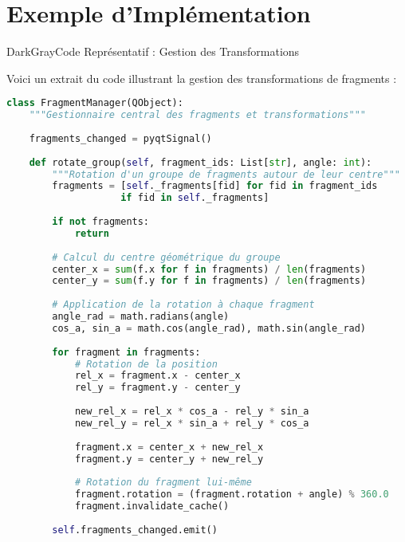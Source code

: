 \documentclass[11pt,a4paper]{article}
\begin{document}
\section{Exemple d'Implémentation}

\begin{subsectionbox}{DarkGray}{Code Représentatif : Gestion des Transformations}

Voici un extrait du code illustrant la gestion des transformations de fragments :

\begin{lstlisting}[language=Python, caption=Gestion des transformations dans FragmentManager]
class FragmentManager(QObject):
    """Gestionnaire central des fragments et transformations"""
    
    fragments_changed = pyqtSignal()
    
    def rotate_group(self, fragment_ids: List[str], angle: int):
        """Rotation d'un groupe de fragments autour de leur centre"""
        fragments = [self._fragments[fid] for fid in fragment_ids 
                    if fid in self._fragments]
        
        if not fragments:
            return
        
        # Calcul du centre géométrique du groupe
        center_x = sum(f.x for f in fragments) / len(fragments)
        center_y = sum(f.y for f in fragments) / len(fragments)
        
        # Application de la rotation à chaque fragment
        angle_rad = math.radians(angle)
        cos_a, sin_a = math.cos(angle_rad), math.sin(angle_rad)
        
        for fragment in fragments:
            # Rotation de la position
            rel_x = fragment.x - center_x
            rel_y = fragment.y - center_y
            
            new_rel_x = rel_x * cos_a - rel_y * sin_a
            new_rel_y = rel_x * sin_a + rel_y * cos_a
            
            fragment.x = center_x + new_rel_x
            fragment.y = center_y + new_rel_y
            
            # Rotation du fragment lui-même
            fragment.rotation = (fragment.rotation + angle) % 360.0
            fragment.invalidate_cache()
        
        self.fragments_changed.emit()
\end{lstlisting}

\end{subsectionbox}
\end{document}
